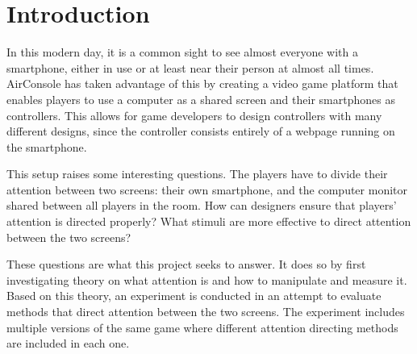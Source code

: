 \chapter{Introduction}\label{ch:intro}
In this modern day, it is a common sight to see almost everyone with a smartphone, either in use or at least near their person at almost all times. AirConsole has taken advantage of this by creating a video game platform that enables players to use a computer as a shared screen and their smartphones as controllers. This allows for game developers to design controllers with many different designs, since the controller consists entirely of a webpage running on the smartphone.

This setup raises some interesting questions. The players have to divide their attention between two screens: their own smartphone, and the computer monitor shared between all players in the room. How can designers ensure that players' attention is directed properly? What stimuli are more effective to direct attention between the two screens?

These questions are what this project seeks to answer. It does so by first investigating theory on what attention is and how to manipulate and measure it. Based on this theory, an experiment is conducted in an attempt to evaluate methods that direct attention between the two screens. The experiment includes multiple versions of the same game where different attention directing methods are included in each one.